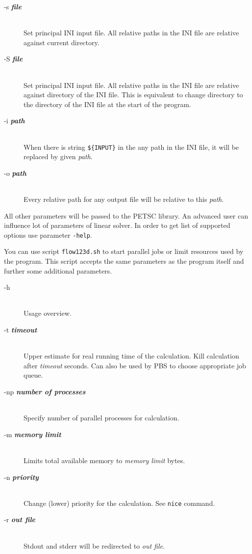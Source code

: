 \documentclass[12pt,a4paper]{report}
\begin{document}
\begin{description}
 \item[-s {\bf\it file}] \hfill\\
 	 Set principal INI input file. All relative paths in the INI file are relative against current directory.
 \item[-S {\bf\it file}] \hfill\\
 	Set principal INI input file. All relative paths in the INI file are relative against directory of the INI file. This is equivalent
to change directory to the directory of the INI file at the start of the program.
 \item[-i {\bf\it path}] \hfill\\
 	When there is string \verb"${INPUT}" %
  	in the any path in the INI file, it will be replaced by given {\it path}.
 \item[-o {\bf\it path}] \hfill\\
 	Every relative path for any output file will be relative to this {\it path}. 
\end{description}

All other parameters will be passed to the PETSC library. An advanced user can influence lot of parameters of linear solver. In order to get list of supported options 
use parameter \verb'-help'.


You can use script \verb'flow123d.sh' to start parallel jobs or limit resources used by the program. This script accepts the same parameters as the program itself
and further some additional parameters.

\begin{description}
  \item[-h] \hfill\\
  	Usage overview.
  \item[-t {\bf\it timeout}] \hfill\\
  	Upper estimate for real running time of the calculation. Kill calculation after {\it timeout} seconds. 
  	Can also be used by PBS to choose appropriate job queue. 
  \item[-np {\bf\it number of processes}] \hfill\\
  	Specify number of parallel processes for calculation.
  \item[-m {\bf\it memory limit}] \hfill\\
  	Limits total available memory to {\it memory limit} bytes.
  \item[-n {\bf\it priority}] \hfill\\
  	Change (lower) priority for the calculation. See {\tt nice} command.
  \item[-r {\bf\it out file}] \hfill\\
  	Stdout and stderr will be redirected to {\it out file}.
\end{description}
\end{document}

